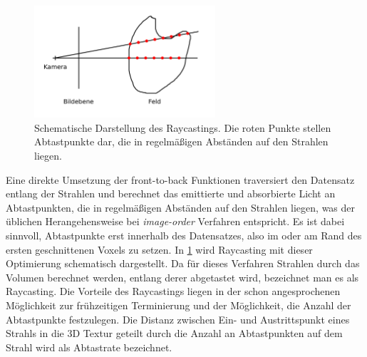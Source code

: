 \documentclass[a4paper,fontsize=12pt,toc=bib,parskip=half,ngerman]{scrartcl}
\begin{document}
\begin{figure}
	\centering
	\includegraphics[width=0.6\textwidth]{pictures/Raycasting}
	\caption{Schematische Darstellung des Raycastings. Die roten Punkte stellen Abtastpunkte dar, die in regelm\"a{\ss}igen Abst\"anden auf den Strahlen liegen.}
	\label{Raycasting}
\end{figure}

Eine direkte Umsetzung der front-to-back Funktionen traversiert den Datensatz entlang der Strahlen und berechnet das emittierte und absorbierte Licht an Abtastpunkten, die in regelm\"a{\ss}igen Abst\"anden auf den Strahlen liegen, was der \"ublichen Herangehensweise bei \textit{image-order} Verfahren entspricht. Es ist dabei sinnvoll, Abtastpunkte erst innerhalb des Datensatzes, also im oder am Rand des ersten geschnittenen Voxels zu setzen. In \cref{Raycasting} wird Raycasting mit dieser Optimierung schematisch dargestellt. 
Da f\"ur dieses Verfahren Strahlen durch das Volumen berechnet werden, entlang derer abgetastet wird, bezeichnet man es als Raycasting. Die Vorteile des Raycastings liegen in der schon angesprochenen M\"oglichkeit zur fr\"uhzeitigen Terminierung und der M\"oglichkeit, die Anzahl der Abtastpunkte festzulegen. Die Distanz zwischen Ein- und Austrittspunkt eines Strahls in die 3D Textur geteilt durch die Anzahl an Abtastpunkten auf dem Strahl wird als \glq Abtastrate\grq{} bezeichnet.
\end{document}
